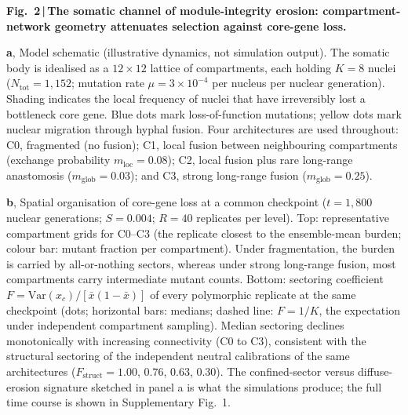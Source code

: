 
\noindent\textbf{Fig.~2\,|\,The somatic channel of module-integrity
erosion: compartment-network geometry attenuates selection against
core-gene loss.}

\smallskip
\noindent\textbf{a}, Model schematic (illustrative dynamics, not
simulation output). The somatic body is idealised as a $12\times12$
lattice of compartments, each holding $K=8$ nuclei
($N_{\mathrm{tot}}=1{,}152$; mutation rate $\mu=3\times10^{-4}$ per
nucleus per nuclear generation). Shading indicates the local frequency of
nuclei that have irreversibly lost a bottleneck core gene. Blue dots mark
loss-of-function mutations; yellow dots mark nuclear migration through
hyphal fusion. Four architectures are used throughout: C0, fragmented
(no fusion); C1, local fusion between neighbouring compartments
(exchange probability $m_{\mathrm{loc}}=0.08$); C2, local fusion plus
rare long-range anastomosis ($m_{\mathrm{glob}}=0.03$); and C3, strong
long-range fusion ($m_{\mathrm{glob}}=0.25$).

\smallskip
\noindent\textbf{b}, Spatial organisation of core-gene loss at a common
checkpoint ($t=1{,}800$ nuclear generations; $S=0.004$; $R=40$
replicates per level). Top: representative compartment grids for
C0--C3 (the replicate closest to the ensemble-mean burden; colour bar:
mutant fraction per compartment). Under fragmentation, the burden is
carried by all-or-nothing sectors, whereas under strong long-range
fusion, most compartments carry intermediate mutant counts. Bottom:
sectoring coefficient $F=\mathrm{Var}(x_c)/[\bar{x}(1-\bar{x})]$ of
every polymorphic replicate at the same checkpoint (dots; horizontal
bars: medians; dashed line: $F=1/K$, the expectation under independent
compartment sampling). Median sectoring declines monotonically with
increasing connectivity (C0 to C3), consistent with the structural
sectoring of the independent neutral calibrations of the same
architectures ($F_{\mathrm{struct}}=1.00$, $0.76$, $0.63$, $0.30$).
The confined-sector versus diffuse-erosion signature sketched in panel a
is what the simulations produce; the full time course is shown in
Supplementary Fig.~1.

